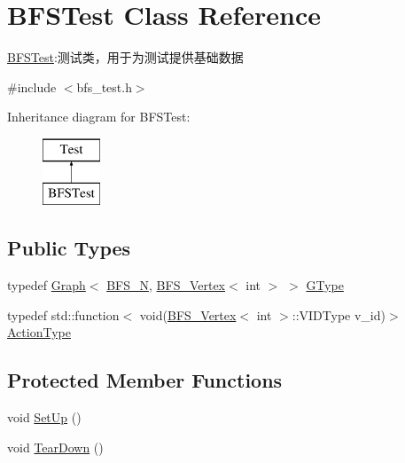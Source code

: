 \hypertarget{class_b_f_s_test}{}\section{B\+F\+S\+Test Class Reference}
\label{class_b_f_s_test}


\hyperlink{class_b_f_s_test}{B\+F\+S\+Test}\+:测试类，用于为测试提供基础数据  




{\ttfamily \#include $<$bfs\+\_\+test.\+h$>$}

Inheritance diagram for B\+F\+S\+Test\+:\begin{figure}[H]
\begin{center}
\leavevmode
\includegraphics[height=2.000000cm]{class_b_f_s_test}
\end{center}
\end{figure}
\subsection*{Public Types}
\begin{DoxyCompactItemize}
\item 
typedef \hyperlink{struct_introduction_to_algorithm_1_1_graph_algorithm_1_1_graph}{Graph}$<$ \hyperlink{bfs__test_8h_a03ae95bcf3deb5cb7f847e18cef466d1}{B\+F\+S\+\_\+\+N}, \hyperlink{struct_introduction_to_algorithm_1_1_graph_algorithm_1_1_b_f_s___vertex}{B\+F\+S\+\_\+\+Vertex}$<$ int $>$ $>$ \hyperlink{class_b_f_s_test_ad38ca5029d5674d467dc71d13f5e5c7c}{G\+Type}
\item 
typedef std\+::function$<$ void(\hyperlink{struct_introduction_to_algorithm_1_1_graph_algorithm_1_1_b_f_s___vertex}{B\+F\+S\+\_\+\+Vertex}$<$ int $>$\+::V\+I\+D\+Type v\+\_\+id)$>$ \hyperlink{class_b_f_s_test_a4012e860a3e78030ef0f4f544a834177}{Action\+Type}
\end{DoxyCompactItemize}
\subsection*{Protected Member Functions}
\begin{DoxyCompactItemize}
\item 
void \hyperlink{class_b_f_s_test_a295164608e7887ea16383eb80e0d2a45}{Set\+Up} ()
\item 
void \hyperlink{class_b_f_s_test_ac160dd8773850140c50cde59c8498764}{Tear\+Down} ()
\end{DoxyCompactItemize}
